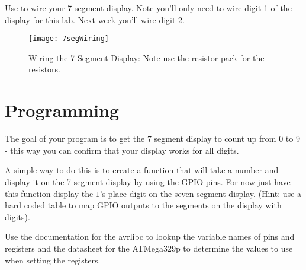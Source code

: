 \documentclass[main.tex]{subfile}
\begin{document}

Use  to wire your 7-segment display. Note you'll only need to
wire digit 1 of the display for this lab. Next week you'll wire digit 2.

\begin{figure}[h]
	\begin{center}
		\texttt{[image: 7segWiring]}
	\end{center}
	\caption{Wiring the 7-Segment Display: Note use the resistor pack for the resistors.}
	\label{fig:wiringDia}
\end{figure}


\section{Programming} 
\label{sec:programming}

The goal of your program is to get the 7 segment display to count up from $0$ to
$9$ - this way you can confirm that your display works for all digits.

A simple way to do this is to create a function that will take a number and
display it on the 7-segment display by using the GPIO pins. For now just have
this function display the $1$'s place digit on the seven segment display. (Hint: use a
hard coded table to map GPIO outputs to the segments on the display with digits).

Use the documentation for the avrlibc to lookup the variable names of pins and
registers and the datasheet for the ATMega329p to determine the values to use
when setting the registers.

\end{document}
